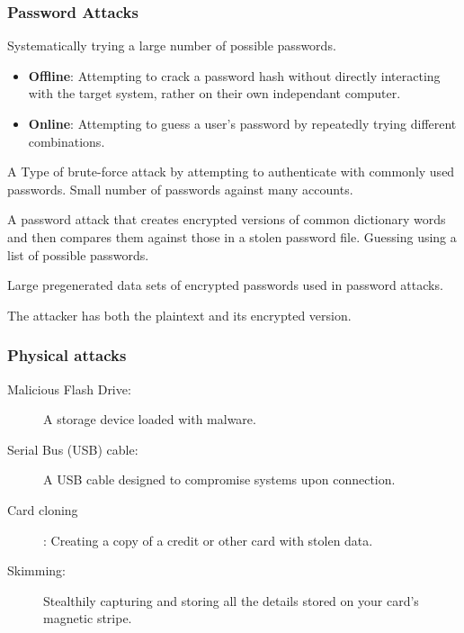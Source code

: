 \subsubsection*{\color{blue}Password Attacks}
\begin{fullwidth}
    \begin{description}\itemsep2pt
        \item[Brute Force:] Systematically trying a large number of possible passwords.
        \begin{itemize}\itemsep2pt
            \item \textbf{Offline}: Attempting to crack a password hash without directly interacting with the target system, rather on their own independant computer.
            \item \textbf{Online}: Attempting to guess a user's password by repeatedly trying different combinations.
        \end{itemize}
        \item[Sprying:] A Type of brute-force attack by attempting to authenticate with commonly used passwords. Small number of passwords against many accounts.
        \item[Dictionary:] A password attack that creates encrypted versions of common dictionary words and then compares them against those in a stolen password file. Guessing using a list of possible passwords. 
        \item[Rainbow Table:] Large pregenerated data sets of encrypted passwords used in password attacks.
        \item[Plaintext/Unencrypted:] The attacker has both the plaintext and its encrypted version.
    \end{description}
\end{fullwidth}

\subsubsection*{\color{purple}Physical attacks}
\begin{fullwidth}
    \begin{description}
        \item[Malicious Flash Drive:] A storage device loaded with malware.
        \item[Serial Bus (USB) cable:] A USB cable designed to compromise systems upon connection.
        \item[Card cloning]: Creating a copy of a credit or other card with stolen data.
        \item[Skimming:] Stealthily capturing and storing all the details stored on your card’s magnetic stripe.
    \end{description}
\end{fullwidth}

